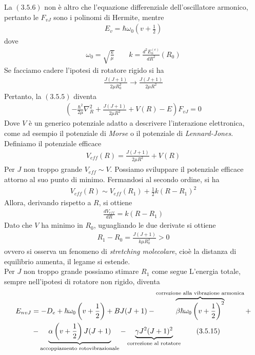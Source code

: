 \documentclass{article}
\begin{document}
La $(3.5.6)$ non è altro che l'equazione differenziale dell'oscillatore armonico, pertanto le $F_{vJ}$ sono i polinomi di Hermite, mentre 
\begin{align}
    E_v = \hbar\omega_0\left(v + \frac{1}{2}\right) \tag{3.5.7}
\end{align}
dove 
\begin{align}
    \omega_0 = \sqrt{\frac{k}{\mu}} \qquad k = \frac{d^2E^{(e)}_n}{dR^2}(R_0) \tag{3.5.8}
\end{align}
Se facciamo cadere l'ipotesi di rotatore rigido si ha 
\begin{align}
    \frac{J(J + 1)}{2\mu R^2_0} \rightarrow \frac{J(J + 1)}{2\mu R^2} \tag{3.5.9}
\end{align}
Pertanto, la $(3.5.5)$ diventa 
\begin{align}
    \left(-\frac{\hbar^2}{2\mu}\nabla^2_R + \frac{J(J + 1)}{2\mu R^2} + V(R) - E\right)F_{vJ} = 0 \tag{3.5.10}
\end{align}
Dove $V$ è un generico potenziale adatto a descrivere l'interazione elettronica, come ad esempio il potenziale di \textit{Morse} o il potenziale di \textit{Lennard-Jones}. Definiamo il potenziale efficace 
\begin{align}
    V_{eff}(R) = \frac{J(J + 1)}{2\mu R^2} + V(R) \tag{3.5.11}
\end{align}
Per $J$ non troppo grande $V_{eff} \sim V$. Possiamo sviluppare il potenziale efficace attorno al suo punto di minimo. Fermandosi al secondo ordine, si ha
\begin{align}
    V_{eff}(R) \sim V_{eff}(R_1) + \frac{1}{2}k(R - R_1)^2 \tag{3.5.12}
\end{align}
Allora, derivando rispetto a $R$, si ottiene 
\begin{align}
    \frac{dV_{eff}}{dR} = k(R - R_1) \tag{3.5.13}
\end{align}
Dato che $V$ ha minimo in $R_0$, uguagliando le due derivate si ottiene 
\begin{align}
    R_1 - R_0 = \frac{J(J + 1)}{k\mu R^3_0} > 0 \tag{3.5.14}
\end{align}
ovvero si osserva un fenomeno di \textit{stretching molecolare}, cioè la distanza di equilibrio aumenta, il legame si estende. \\
Per $J$ non troppo grande possiamo stimare $R_1$ come segue 
L'energia totale, sempre nell'ipotesi di rotatore non rigido, diventa 
\begin{align}
    E_{nvJ} &= -D_e + \hbar\omega_0\left(v + \frac{1}{2}\right) + BJ(J + 1) - \overbrace{\beta\hbar\omega_0\left(v + \frac{1}{2}\right)^2}^{\text{correzione alla vibrazione armonica}} + \notag \\
    &- \underbrace{\alpha\left(v + \frac{1}{2}\right)J(J + 1)}_{\text{accoppiamento rotovibrazionale}} - \underbrace{\gamma J^2(J + 1)^2}_{\text{correzione al rotatore}} \tag{3.5.15}
\end{align}
\end{document}
